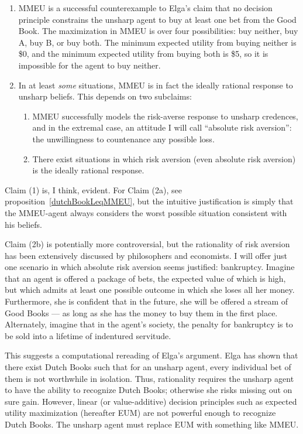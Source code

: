 \documentclass[letterpaper,12pt]{article}
\begin{document}
\begin{enumerate}
\item
MMEU is a successful counterexample to Elga's claim that no decision principle constrains the unsharp agent to buy at least one bet from the Good Book. The maximization in MMEU is over four possibilities: buy neither, buy A, buy B, or buy both. The minimum expected utility from buying neither is \$0, and the minimum expected utility from buying both is \$5, so it is impossible for the agent to buy neither.
\item
In at least \emph{some} situations, MMEU is in fact the ideally rational response to unsharp beliefs. This depends on two subclaims:
\begin{enumerate}
\item
MMEU successfully models the risk-averse response to unsharp credences, and in the extremal case, an attitude I will call ``absolute risk aversion'': the unwillingness to countenance any possible loss.
\item
There exist situations in which risk aversion (even absolute risk aversion) is the ideally rational response.
\end{enumerate}
\end{enumerate}

Claim (1) is, I think, evident. For Claim (2a), see proposition~\ref{dutchBookLeqMMEU}, but the intuitive justification is simply that the MMEU-agent always considers the worst possible situation consistent with his beliefs.

Claim (2b) is potentially more controversial, but the rationality of risk aversion has been extensively discussed by philosophers and economists. I will offer just one scenario in which absolute risk aversion seems justified: bankruptcy. Imagine that an agent is offered a package of bets, the expected value of which is high, but which admits at least one possible outcome in which she loses all her money. Furthermore, she is confident that in the future, she will be offered a stream of Good Books --- as long as she has the money to buy them in the first place. Alternately, imagine that in the agent's society, the penalty for bankruptcy is to be sold into a lifetime of indentured servitude.

This suggests a computational rereading of Elga's argument. Elga has shown that there exist Dutch Books such that for an unsharp agent, every individual bet of them is not worthwhile in isolation. Thus, rationality requires the unsharp agent to have the ability to recognize Dutch Books; otherwise she risks missing out on sure gain. However, linear (or value-additive) decision principles such as expected utility maximization (hereafter EUM) are not powerful enough to recognize Dutch Books. The unsharp agent must replace EUM with something like MMEU.
\end{document}
